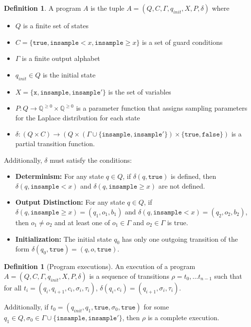 \documentclass[12pt]{article}
\newcommand{\QQ}{\mathbb{Q}}
\newcommand{\gguard}[1][x]{\texttt{insample}\geq #1}
\newcommand{\lguard}[1][x]{\texttt{insample} < #1}
\theoremstyle{definition}
\newtheorem{defn}[thm]{Definition}
\begin{document}
\begin{defn}
    A program $A$ is the tuple $A =(Q, C, \Gamma, q_{init}, X,P, \delta)$ where \begin{itemize}
        \item $Q$ is a finite set of states 
        \item $C = \{\texttt{true}, \lguard, \gguard\}$ is a set of guard conditions
        \item $\Gamma$ is a finite output alphabet
        \item $q_{init}\in Q$ is the initial state
        \item $X = \{\texttt{x}, \texttt{insample}, \texttt{insample}'\}$ is the set of variables
        \item $P: Q\to \QQ^{\geq 0}\times \QQ^{\geq 0}$ is a parameter function that assigns sampling parameters for the Laplace distribution for each state
        \item $\delta:(Q\times C)\to (Q\times (\Gamma \cup \{\texttt{insample}, \texttt{insample}'\})\times \{\texttt{true}, \texttt{false}\})$ is a partial transition function. 
    \end{itemize}
    Additionally, $\delta$ must satisfy the conditions:
    \begin{itemize}
        \item \textbf{Determinism:} For any state $q\in Q$, if $\delta(q,\texttt{true})$ is defined, then $\delta(q,\lguard)$ and $\delta(q,\gguard)$ are not defined. 

        \item \textbf{Output Distinction:} For any state $q\in Q$, if $\delta(q, \gguard) = (q_1, o_1, b_1)$ and $\delta(q, \lguard) = (q_2, o_2, b_2)$, then $o_1\neq o_2$ and at least one of $o_1\in \Gamma$ and $o_2\in \Gamma$ is true.

        \item \textbf{Initialization:} The initial state $q_0$ has only one outgoing transition of the form $\delta(q_0, \texttt{true}) = (q, o, \texttt{true})$.
    \end{itemize}
\end{defn}

\begin{defn}[Program executions]
    An execution of a program $A = (Q, C, \Gamma, q_{init}, X, P, \delta)$ is a sequence of transitions $\rho = t_0, \ldots t_{n-1}$ such that for all $t_i = (q_i, q_{i+1}, c_i, \sigma_i, \tau_i)$, $\delta(q_i, c_i) = (q_{i+1}, \sigma_i, \tau_i)$. 

    Additionally, if $t_0 = (q_{init}, q_1, \texttt{true}, \sigma_0, \texttt{true})$ for some $q_1 \in Q, \sigma_0\in \Gamma\cup\{\texttt{insample}, \texttt{insample}'\}$, then $\rho$ is a complete execution. 
\end{defn}
\end{document}
